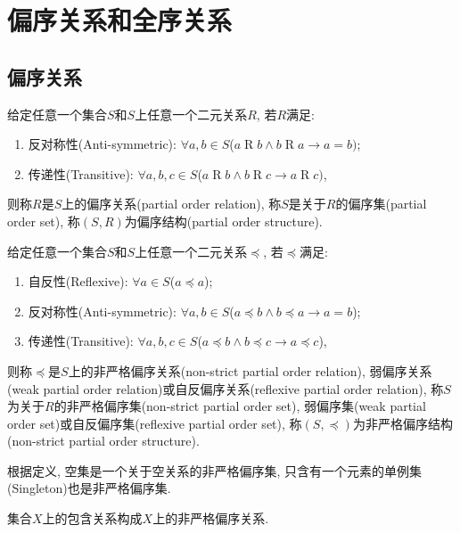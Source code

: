 \chapter{偏序关系和全序关系}
\section{偏序关系}
\begin{definition}[偏序关系]
	给定任意一个集合$S$和$S$上任意一个二元关系$R$, 若$R$满足:
	\begin{enumerate}
		\item 反对称性(Anti-symmetric): $\forall a,b\in S$($a\mathrel Rb\wedge b\mathrel Ra\rightarrow a=b)$;
		\item 传递性(Transitive): $\forall a,b,c\in S$($a\mathrel Rb\wedge b\mathrel Rc\rightarrow a\mathrel Rc)$,
	\end{enumerate}
	则称$R$是$S$上的偏序关系(partial order relation), 称$S$是关于$R$的偏序集(partial order set), 称$(S,R)$为偏序结构(partial order structure).
\end{definition}

\begin{definition}[非严格偏序关系]
	给定任意一个集合$S$和$S$上任意一个二元关系$\preccurlyeq$, 若$\preccurlyeq$满足:
	\begin{enumerate}
		\item 自反性(Reflexive): $\forall a\in S$($a\preccurlyeq a$);
		\item 反对称性(Anti-symmetric): $\forall a,b\in S$($a\preccurlyeq b\wedge b\preccurlyeq a\rightarrow a=b$);
		\item 传递性(Transitive): $\forall a,b,c\in S$($a\preccurlyeq b\wedge b\preccurlyeq c\rightarrow a\preccurlyeq c$),
	\end{enumerate}
	则称$\preccurlyeq$是$S$上的非严格偏序关系(non-strict partial order relation), 弱偏序关系(weak partial order relation)或自反偏序关系(reflexive partial order relation), 称$S$为关于$R$的非严格偏序集(non-strict partial order set), 弱偏序集(weak partial order set)或自反偏序集(reflexive partial order set), 称$(S,\preccurlyeq)$为非严格偏序结构(non-strict partial order structure).
\end{definition}


根据定义, 空集是一个关于空关系的非严格偏序集, 只含有一个元素的单例集(Singleton)也是非严格偏序集.

\begin{proposition}
	集合$X$上的包含关系构成$X$上的非严格偏序关系.
\end{proposition}

